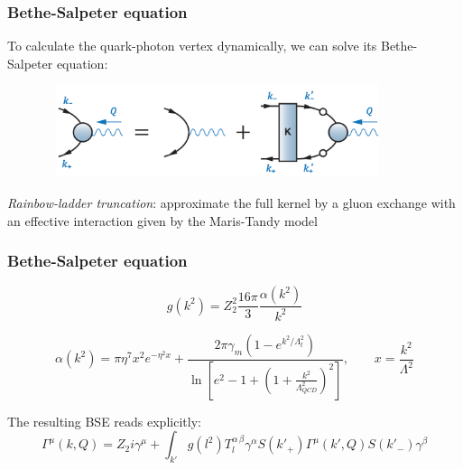 \begin{frame}\frametitle{Bethe-Salpeter equation}
To calculate the quark-photon vertex dynamically, we can solve its Bethe-Salpeter equation:
\begin{figure}[h]
	\centering
	\includegraphics[height=2.7cm, width=10.2cm]{BSE.png}
\end{figure}
\textit{Rainbow-ladder truncation}: approximate the full kernel by
a gluon exchange with an effective interaction given by the Maris-Tandy model 


\end{frame}

\begin{frame}\frametitle{Bethe-Salpeter equation}
	
\begin{equation}
	g(k^2)=Z^2_2\frac{16\pi}{3}\frac{\alpha(k^2)}{k^2}
\end{equation}	

\begin{equation}
\alpha(k^2)=\pi \eta^7 x^2 e^{-\eta^2 x} + \frac{2\pi\gamma_m\left(1-e^{k^2/\Lambda_t^2}\right)}{\ln\left[e^2 - 1 + \left(1 + \frac{k^2}{\Lambda_{QCD}^2}\right)^2\right]}, \qquad x=\frac{k^2}{\Lambda^2}
\end{equation}

The resulting BSE reads explicitly:
\begin{equation}
	\Gamma^\mu(k, Q)=Z_2i\gamma^\mu+\int_{k'}\!\!g(l^2)T^{\alpha\,\beta}_l\gamma^\alpha S(k'_+)\Gamma^\mu(k', Q)S(k'_-)\gamma^\beta
\end{equation}
\end{frame}

\endinput
